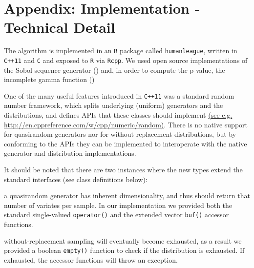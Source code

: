 \documentclass{JASSS}
\begin{document}



\section{Appendix: Implementation - Technical Detail} 
The algorithm is implemented in an \texttt{R} package called
\texttt{humanleague}, written in \texttt{C++11} and \texttt{C} and
exposed to \texttt{R} via \texttt{Rcpp}. We used open source
implementations of the Sobol sequence generator (\cite{johnson_stevengj/nlopt:_nodate}) and, in order to 
compute the p-value, the
incomplete gamma function (\cite{burkardt_asa032_2008})

One of the many useful features introduced in \texttt{C++11} was a
standard random number framework, which splits underlying (uniform) generators
and the distributions, and defines APIs that these classes should
implement \href{http://en.cppreference.com/w/cpp/numeric/random}{(see
e.g. http://en.cppreference.com/w/cpp/numeric/random)}. There is no
native support for quasirandom generators nor for without-replacement
distributions, but by conforming to the APIs they can be implemented to
interoperate with the native generator and distribution implementations.

It should be noted that there are two instances where the new types
extend the standard interfaces (see class definitions below):

\begin{itemize*}
\item
  a quasirandom generator has inherent dimensionality, and thus should
  return that number of variates per sample. In our implementation we
  provided both the standard single-valued \texttt{operator()} and the
  extended vector \texttt{buf()} accessor functions.
\item
  without-replacement sampling will eventually become exhausted, as a
  result we provided a boolean \texttt{empty()} function to check if the
  distribution is exhausted. If exhausted, the accessor functions will
  throw an exception.
\end{itemize*}
\end{document}

